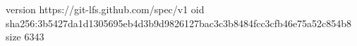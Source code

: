 version https://git-lfs.github.com/spec/v1
oid sha256:3b5427da1d1305695eb4d3b9d9826127bac3c3b8484fcc3cfb46e75a52c854b8
size 6343
